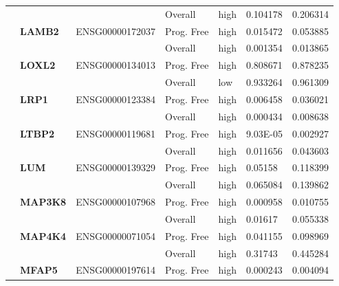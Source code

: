 \begin{spacing}{1}
{\begin{longtable}{%
            |>{\bfseries}p{2cm}|
            >{\bfseries}p{1.9cm}|
            >{\tiny}p{1.9cm}|
            p{2cm}|
            p{2cm}|
            p{1.5cm}|
            p{1.5cm}|
            }
            \hhline{~~~----}
             &          &                 & Overall    & high & 0.104178 & 0.206314 \\
            \hhline{~======}
             & LAMB2    & ENSG00000172037 & Prog. Free & high & 0.015472 & 0.053885 \\
            \hhline{~~~----}
             &          &                 & Overall    & high & 0.001354 & 0.013865 \\
            \hhline{~======}
             & LOXL2    & ENSG00000134013 & Prog. Free & high & 0.808671 & 0.878235 \\
            \hhline{~~~----}
             &          &                 & Overall    & low  & 0.933264 & 0.961309 \\
            \hhline{~======}
             & LRP1     & ENSG00000123384 & Prog. Free & high & 0.006458 & 0.036021 \\
            \hhline{~~~----}
             &          &                 & Overall    & high & 0.000434 & 0.008638 \\
            \hhline{~======}
             & LTBP2    & ENSG00000119681 & Prog. Free & high & 9.03E-05 & 0.002927 \\
            \hhline{~~~----}
             &          &                 & Overall    & high & 0.011656 & 0.043603 \\
            \hhline{~======}
             & LUM      & ENSG00000139329 & Prog. Free & high & 0.05158  & 0.118399 \\
            \hhline{~~~----}
             &          &                 & Overall    & high & 0.065084 & 0.139862 \\
            \hhline{~======}
            \multirow{2}{3cm}{True}
             & MAP3K8   & ENSG00000107968 & Prog. Free & high & 0.000958 & 0.010755 \\
            \hhline{~~~----}
             &          &                 & Overall    & high & 0.01617  & 0.055338 \\
            \hhline{~======}
             & MAP4K4   & ENSG00000071054 & Prog. Free & high & 0.041155 & 0.098969 \\
            \hhline{~~~----}
             &          &                 & Overall    & high & 0.31743  & 0.445284 \\
            \hhline{~======}
             & MFAP5    & ENSG00000197614 & Prog. Free & high & 0.000243 & 0.004094 \\

\end{longtable}}
\end{spacing}
